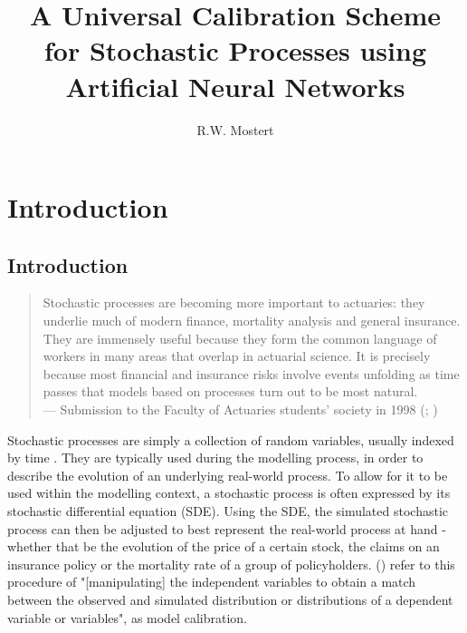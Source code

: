 \documentclass[11pt,oneside,openany,a4paper,english, report, goldenblock
]{usthesis}
\title{A Universal Calibration Scheme for Stochastic Processes using Artificial Neural Networks}
\author{R.W. Mostert}{Rayno Willem Mostert}
\begin{document}
	
	\TitlePage%
	
	\DeclarationPage
	
\begin{abstract}
	
\end{abstract}

\tableofcontents
	
\chapter{Introduction}
\section{Introduction}

\begin{quote}
	Stochastic processes are becoming more important to actuaries: they underlie much of modern finance, mortality analysis and general insurance. They are immensely useful because they form the common language of workers in many areas that overlap in actuarial science.  It is precisely because most financial and insurance risks involve events unfolding as time passes that models based on processes turn out to be most natural.
	\\ --- Submission to the Faculty of Actuaries students' society in 1998 (; \citeyear{cairns1998stochastic})
\end{quote}

Stochastic processes are simply a collection of random variables, usually indexed by time \citep{Barone-Adesi}. They are typically used during the modelling process, in order to describe the evolution of an underlying real-world process. To allow for it to be used within the modelling context, a stochastic process is often expressed by its stochastic differential equation (SDE). 
Using the SDE, the simulated stochastic process can then be adjusted to best represent the real-world process at hand - whether that be the evolution of the price of a certain stock, the claims on an insurance policy or the mortality rate of a group of policyholders. 
 (\citeyear{Oreskes}) refer to this procedure of "[manipulating] the independent variables to obtain a match between the observed and simulated distribution or distributions of a dependent variable or variables", as model calibration.
\end{document}
